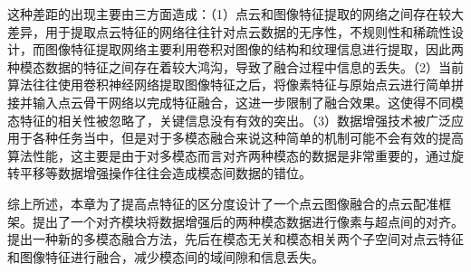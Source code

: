     这种差距的出现主要由三方面造成：（1）点云和图像特征提取的网络之间存在较大差异，用于提取点云特征的网络往往针对点云数据的无序性，不规则性和稀疏性设计，而图像特征提取网络主要利用卷积对图像的结构和纹理信息进行提取，因此两种模态数据的特征之间存在着较大鸿沟，导致了融合过程中信息的丢失。（2）当前算法往往使用卷积神经网络提取图像特征之后，将像素特征与原始点云进行简单拼接并输入点云骨干网络以完成特征融合，这进一步限制了融合效果。这使得不同模态特征的相关性被忽略了，关键信息没有有效的突出。（3）数据增强技术被广泛应用于各种任务当中，但是对于多模态融合来说这种简单的机制可能不会有效的提高算法性能，这主要是由于对多模态而言对齐两种模态的数据是非常重要的，通过旋转平移等数据增强操作往往会造成模态间数据的错位。

    综上所述，本章为了提高点特征的区分度设计了一个点云图像融合的点云配准框架。提出了一个对齐模块将数据增强后的两种模态数据进行像素与超点间的对齐。提出一种新的多模态融合方法，先后在模态无关和模态相关两个子空间对点云特征和图像特征进行融合，减少模态间的域间隙和信息丢失。




